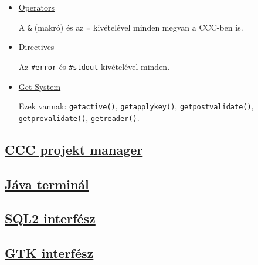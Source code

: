 \begin{itemize}
\item \href{http://ccc.comfirm.hu/pub/ng/Clipper-guide/ngc8ba2.html}{Operators}
    \par
    A \verb!&! (makró) és az \verb!=! kivételével minden megvan a CCC-ben is.

\item \href{http://ccc.comfirm.hu/pub/ng/Clipper-guide/ngd8973.html}{Directives}
    \par
    Az \verb!#error! és \verb!#stdout! kivételével minden.

\item \href{http://ccc.comfirm.hu/pub/ng/Clipper-guide/nge36fa.html}{Get System}
    \par
    Ezek vannak:
    \verb!getactive()!,
    \verb!getapplykey()!,
    \verb!getpostvalidate()!,
    \verb!getprevalidate()!,
    \verb!getreader()!.

\end{itemize}

\subsection{
\protect\href{http://ccc.comfirm.hu/ccc3/build.html}{CCC projekt manager}
}

\subsection{
\protect\href{http://ccc.comfirm.hu/ccc3/jterminal.html}{Jáva terminál}
}

\subsection{
\protect\href{http://ccc.comfirm.hu/ccc3/sql2.html}{SQL2 interfész}
}

\subsection{
\protect\href{http://ccc.comfirm.hu/ccc3/cccgtk.html}{GTK interfész}
}




